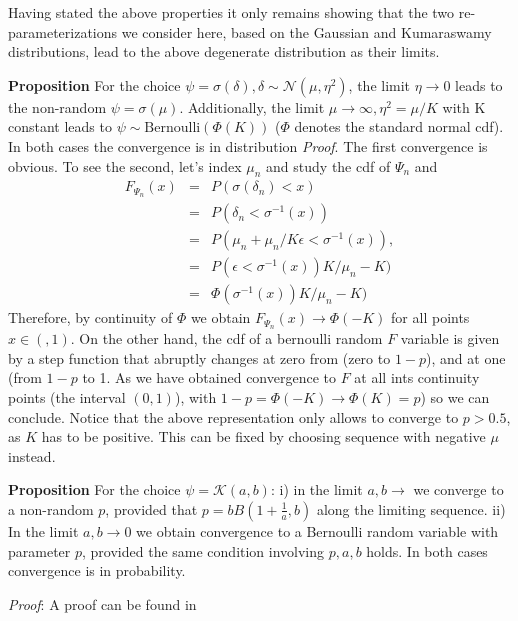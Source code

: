 \documentclass{article}
\begin{document}
Having stated the above properties it only remains showing that the two re-parameterizations we consider here, based on the Gaussian and Kumaraswamy distributions, lead to the above degenerate distribution as their limits.

\textbf{Proposition} For the choice $\psi=\sigma(\delta),\delta\sim\mathcal{N}(\mu,\eta^2)$, the limit $\eta\rightarrow 0$ leads to the non-random $\psi=\sigma(\mu)$. Additionally, the limit $\mu\rightarrow \infty, \eta^2=\mu/K$ with K constant leads to $\psi\sim \text{Bernoulli}(\Phi(K))$ ($\Phi$ denotes the standard normal cdf). In both cases the convergence is in distribution \textit{Proof}. The first convergence is obvious. To see the second, let's index $\mu_n$ and  study the cdf of $\Psi_n$ and 
\begin{align}F_{\Psi_n}(x)&=& P(\sigma(\delta_n)<x) \\
&=&P(\delta_n< \sigma^{-1}(x))\\
&=& P(\mu_n +\mu_n/K\epsilon <\sigma^{-1}(x)),\\\
&=& P( \epsilon <\sigma^{-1}(x))K/\mu_n -K)\\
&=& \Phi( \sigma^{-1}(x))K/\mu_n -K) 
\end{align}
Therefore, by continuity of $\Phi$ we obtain $F_{\Psi_n}(x)\rightarrow \Phi(-K)$ for all points $x\in(,1)$. On the other hand, the cdf of a bernoulli random $F$ variable is given by  a step function that abruptly changes at zero from (zero to $1-p$), and at one (from $1-p$ to 1. As we have obtained convergence to $F$ at all ints continuity points (the interval $(0,1)$), with $1-p= \Phi(-K)\rightarrow \Phi(K)=p$) so we can conclude. Notice that the above representation only allows   to converge to $p>0.5$, as $K$ has to be positive. This can be fixed by choosing sequence with negative $\mu$ instead.

\textbf{Proposition} For the choice $\psi=\mathcal{K}(a,b)$: i) in the limit $a,b \rightarrow $  we converge to a non-random $p$, provided that $p=bB\left(1+\frac{1}{a},b\right)$ along the limiting sequence. ii) In the limit $a,b\rightarrow 0$ we obtain convergence to a Bernoulli random variable with parameter $p$, provided the same condition involving $p,a,b$ holds. In both cases convergence is in probability.


\textit{Proof}: A proof can be found in \cite{mitnik2013kumar}
\end{document}

